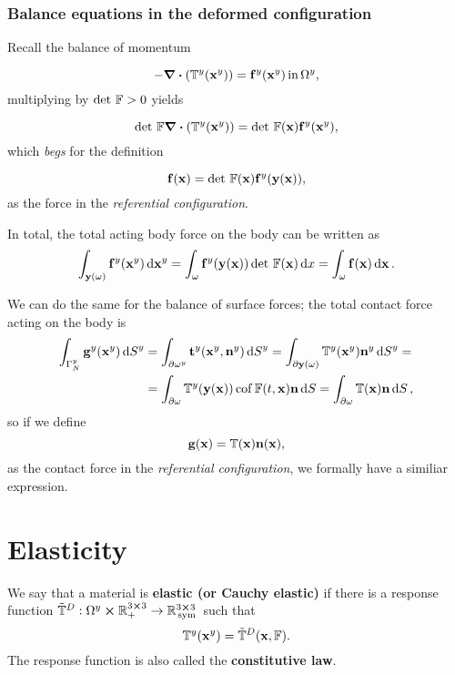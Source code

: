 \documentclass[reqno, a4paper]{article}
\begin{document}
\subsubsection{Balance equations in the deformed configuration}
\label{sec:balance_equations_piola}
Recall the balance of momentum

\begin{equation*}
    -\divergence{\qty(\cstress\qty(\vb{x}^{y}))}=\vb{f}^{y}\qty(\vb{x}^{y}) \, \text{in} \, \Omega^{y},
\end{equation*}
multiplying by $\det\, \mathbb{F} >0$ yields

\begin{equation}
    \detf \divergence{\qty(\cstress\qty(\vb{x}^{y}))} = \detf \qty(\vb{x}) \vb{f}^{y}\qty(\vb{x}^{y}),
\end{equation}
which \textit{begs} for the definition

\begin{equation*}
    \vb{f}\qty(\vb{x})= \det\, \mathbb{F} \qty(\vb{x}) \vb{f}^{y}\qty(\vb{y}\qty(\vb{x})),
\end{equation*}
as the force in the \textit{referential configuration}.

In total, the total acting body force on the body can be written as
\[
	\int_{\vb{y}\qty(\omega)}\vb{f}^{y}\qty(\vb{x}^{y})\dd{\vb{x}^{y}} = \int_{\omega}\vb{f}^{y}\qty(\vb{y}\qty(\vb{x}))\det\, \mathbb{F} \qty(\vb{x})\dd{x} = \int_{\omega}\vb{f}\qty(\vb{x})\dd{\vb{x}}.
\]

We can do the same for the balance of surface forces; the total contact force acting on the body is
\begin{align*}
	\int_{\Gamma_N^{y}}\vb{g}^{y}\qty(\vb{x}^{y})\dd{S}^{y} &=\int_{\partial \omega^{y}}\vb{t}^{y}\qty(\vb{x}^{y},\vb{n}^{y})\dd{S}^{y} = \int_{\partial \vb{y}\qty(\omega)}\mathbb{T}^y\qty(\vb{x}^{y})\vb{n}^{y}\dd{S}^{y}=\\
								&=\int_{\partial \omega}\mathbb{T}^y(\vb{y}(\vb{x}))\operatorname{cof} \mathbb{F}(t,\vb{x}) \vb{n}\dd{S} = \int_{\partial \omega}\mathbb{T}\qty(\vb{x})\vb{n}\dd{S},
\end{align*}
so if we define
\[
	\vb{g}(\vb{x}) = \mathbb{T}\qty(\vb{x})\vb{n}\qty(\vb{x}),
\]
as the contact force in the \textit{referential configuration}, we formally have a similiar expression.

\section{Elasticity}
\label{sec:elasticity}

\begin{definition}[Elasticity]
We say that a material is \textbf{elastic (or Cauchy elastic)} if there is a response function $\tilde{\mathbb{T}}^D:\Omega^{y} \cross {\mathbb R}^{3 \cross 3}_+ \to {\mathbb R}^{3 \cross 3}_{\, \text{sym} \,}$ such that
\[
	\mathbb{T}^y\qty(\vb{x}^{y})= \tilde{\mathbb{T}}^D\qty(\vb{x},\mathbb{F}).
\]
The response function is also called the \textbf{constitutive law}.
\end{definition}
\end{document}
